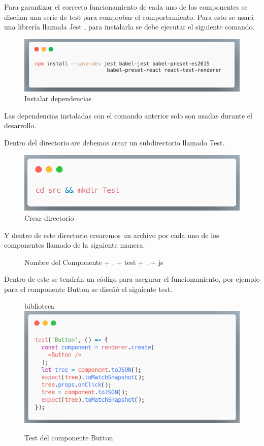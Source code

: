 Para garantizar el correcto funcionamiento de cada uno de los componentes se diseñan una serie de test para comprobar el comportamiento. Para esto se usará una librería llamada Jest \cite{jest} , para instalarla se debe ejecutar el siguiente comando.
\newline
\begin{figure}[H]
    \includegraphics[width=1\textwidth]{./Imagenes/8.39t.png}
    \caption[Instalar dependencias]{Instalar dependencias}
    \end{figure}
\newline
Las dependencias instaladas con el comando anterior solo son usadas durante el desarrollo.

Dentro del directorio src debemos crear un subdirectorio llamado Test.
\newline
\begin{figure}[H]
    \includegraphics[width=1\textwidth]{./Imagenes/8.40t.png}
    \caption[Crear directorio]{Crear directorio}
    \end{figure}
\newline
Y dentro de este directorio crearemos un archivo por cada uno de los componentes llamado de la siguiente manera.
\begin{figure}[H]
   Nombre del Componente + . + test + . + js
    \centering
    \end{figure}
    
 Dentro de este se tendrán un código para asegurar el funcionamiento, por ejemplo para el componente Button se diseñó el siguiente test.
 \newline
\begin{figure}[H]biblioteca
    \includegraphics[width=1\textwidth]{./Imagenes/8.41t.png}
    \caption[Test del componente Button]{Test del componente Button}
    \end{figure}
\newline

